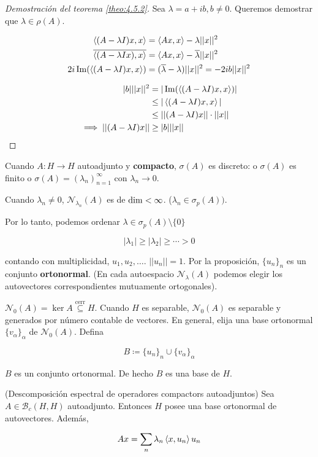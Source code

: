 \begin{proof}[Demostración del teorema \ref{theo:4.5.2}]
   Sea $\lambda=a+ib,b\neq 0$. Queremos demostrar que $\lambda\in\rho(A)$.

   \begin{align*}
      \left\langle (A-\lambda I)x,x\right\rangle&=\left\langle Ax,x\right\rangle-\lambda ||x||^2\\
      \overline{\left\langle (A-\lambda Ix),x\right\rangle}&=\left\langle Ax,x\right\rangle-\overline{\lambda}||x||^2\\
      2i \operatorname{Im} (\left\langle (A-\lambda I)x,x\right\rangle)&=(\overline{\lambda}-\lambda)||x||^2=-2ib||x||^2
   \end{align*}

   \begin{align*}
      |b|||x||^2&=|\operatorname{Im} (\left\langle (A-\lambda I)x,x\right\rangle)|\\
      &\leq |\left\langle (A-\lambda I)x,x\right\rangle|\\
      &\leq ||(A-\lambda I)x||\cdot||x||\\
      \implies ||(A-\lambda I)x||&\geq |b|||x||
   \end{align*}
\end{proof}

Cuando $A:H\to H$ autoadjunto y \textbf{compacto}, $\sigma(A)$ es discreto: o $\sigma(A)$ es finito o $\sigma(A)=(\lambda_n)_{n=1}^\infty$ con $\lambda_n\to 0$.

Cuando $\lambda_n\neq 0$, $\mathcal{N}_{\lambda_n}(A)$ es de $\operatorname{dim}<\infty$. ($\lambda_n\in \sigma_p(A))$.

Por lo tanto, podemos ordenar $\lambda\in\sigma_p(A)\setminus\{0\}$

\[|\lambda_1|\geq |\lambda_2|\geq \cdots>0\]

contando con multiplicidad, $u_1,u_2,\ldots$. $||u_n||=1$. Por la proposición, $\{u_n\}_n$ es un conjunto \textbf{ortonormal}. (En cada autoespacio $\mathcal{N}_\lambda(A)$ podemos elegir los autovectores correspondientes mutuamente ortogonales).

$\mathcal{N}_0(A)=\ker A\overset{\text{cerr}}{\subseteq} H$. Cuando $H$ es separable, $\mathcal{N}_0(A)$ es separable y generados por número contable de vectores. En general, elija una base ortonormal $\{v_\alpha\}_\alpha$ de $\mathcal{N}_0(A)$. Defina 

\[B\coloneqq \{u_n\}_n\cup\{v_\alpha\}_\alpha\]

$B$ es un conjunto ortonormal. De hecho $B$ es una base de $H$.

\begin{ftheorem}(Descomposición espectral de operadores compactors autoadjuntos)
   Sea $A\in\mathcal{B}_c(H,H)$ autoadjunto. Entonces $H$ posee una base ortonormal de autovectores. Además,

   \[Ax=\sum_{n}\lambda_n\left\langle x,u_n\right\rangle u_n\]
\end{ftheorem}

